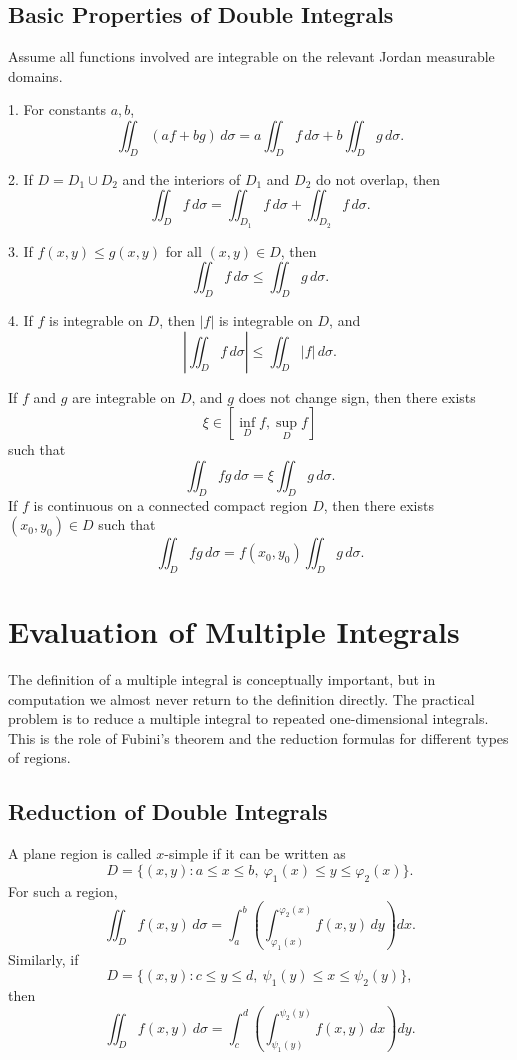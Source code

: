 \subsection{Basic Properties of Double Integrals}

Assume all functions involved are integrable on the relevant Jordan measurable domains.

\begin{property}[]
1. For constants $a,b$,
\[
    \iint_D (af+bg)\,d\sigma
    =a\iint_D f\,d\sigma+b\iint_D g\,d\sigma.
\]

2. If $D=D_1\cup D_2$ and the interiors of $D_1$ and $D_2$ do not overlap, then
\[
    \iint_D f\,d\sigma=\iint_{D_1} f\,d\sigma+\iint_{D_2} f\,d\sigma.
\]

3. If $f(x,y)\le g(x,y)$ for all $(x,y)\in D$, then
\[
    \iint_D f\,d\sigma\le \iint_D g\,d\sigma.
\]

4. If $f$ is integrable on $D$, then $|f|$ is integrable on $D$, and
\[
    \left|\iint_D f\,d\sigma\right|\le \iint_D |f|\,d\sigma.
\]
\end{property}

\begin{theorem}
If $f$ and $g$ are integrable on $D$, and $g$ does not change sign, then there exists
\[
    \xi\in\left[\inf_D f,\sup_D f\right]
\]
such that
\[
    \iint_D fg\,d\sigma=\xi\iint_D g\,d\sigma.
\]
If $f$ is continuous on a connected compact region $D$, then there exists $(x_0,y_0)\in D$ such that
\[
    \iint_D fg\,d\sigma=f(x_0,y_0)\iint_D g\,d\sigma.
\]
\end{theorem}
\section{Evaluation of Multiple Integrals}

The definition of a multiple integral is conceptually important, but in computation we almost never return to the definition directly. The practical problem is to reduce a multiple integral to repeated one-dimensional integrals. This is the role of Fubini's theorem and the reduction formulas for different types of regions.

\subsection{Reduction of Double Integrals}

A plane region is called $x$-simple if it can be written as
\[
    D=\{(x,y):a\le x\le b,\ \varphi_1(x)\le y\le \varphi_2(x)\}.
\]
For such a region,
\[
    \iint_D f(x,y)\,d\sigma
    =\int_a^b\left(\int_{\varphi_1(x)}^{\varphi_2(x)} f(x,y)\,dy\right)dx.
\]
Similarly, if
\[
    D=\{(x,y):c\le y\le d,\ \psi_1(y)\le x\le \psi_2(y)\},
\]
then
\[
    \iint_D f(x,y)\,d\sigma
    =\int_c^d\left(\int_{\psi_1(y)}^{\psi_2(y)} f(x,y)\,dx\right)dy.
\]

